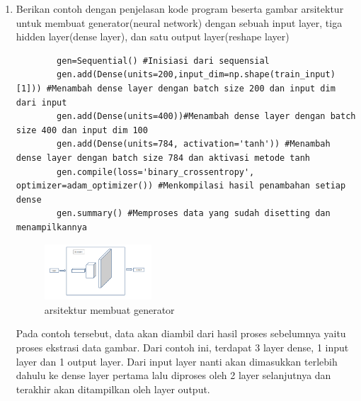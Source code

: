 \begin{enumerate}
    \item Berikan contoh dengan penjelasan kode program beserta gambar arsitektur untuk membuat generator(neural network) dengan sebuah input layer, tiga hidden layer(dense layer), dan satu output layer(reshape layer)
    \hfill\break
    \begin{verbatim}
        gen=Sequential() #Inisiasi dari sequensial
        gen.add(Dense(units=200,input_dim=np.shape(train_input)[1])) #Menambah dense layer dengan batch size 200 dan input dim dari input
        gen.add(Dense(units=400))#Menambah dense layer dengan batch size 400 dan input dim 100
        gen.add(Dense(units=784, activation='tanh')) #Menambah dense layer dengan batch size 784 dan aktivasi metode tanh
        gen.compile(loss='binary_crossentropy', optimizer=adam_optimizer()) #Menkompilasi hasil penambahan setiap dense
        gen.summary() #Memproses data yang sudah disetting dan menampilkannya
    \end{verbatim}
    \begin{figure}[H]
	    \centering
	    \includegraphics[width=4cm]{figures/1174077/8/t9.PNG}
	    \caption{arsitektur membuat generator}
    \end{figure}
    Pada contoh tersebut, data akan diambil dari hasil proses sebelumnya yaitu proses ekstrasi data gambar. Dari contoh ini, terdapat 3 layer dense, 1 input layer dan 1 output layer. Dari input layer nanti akan dimasukkan terlebih dahulu ke dense layer pertama lalu diproses oleh 2 layer selanjutnya dan terakhir akan ditampilkan oleh layer output.


\end{enumerate}
